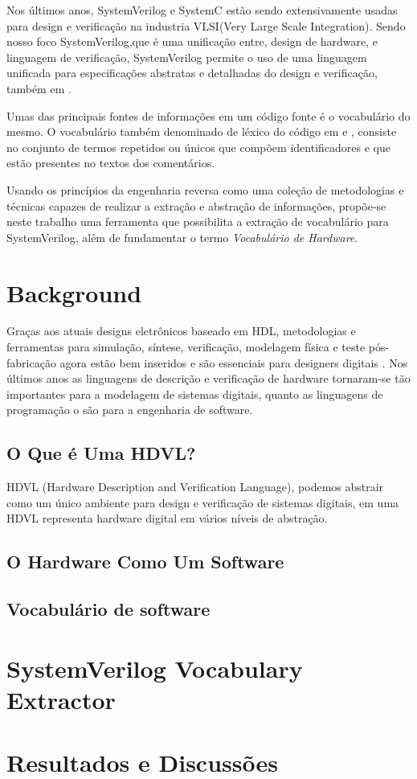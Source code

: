 \documentclass[12pt, twocolumn, a4paper]{article}
\begin{document}
Nos últimos anos, SystemVerilog e SystemC estão sendo extensivamente usadas para design e verificação na industria VLSI(Very Large Scale Integration)\cite{Kumar2014}. Sendo nosso foco SystemVerilog,que é uma unificação entre, design de hardware, e linguagem de verificação\cite{IEEEComputerSociety2013}, SystemVerilog permite o uso de uma linguagem unificada para especificações abstratas e detalhadas do design e verificação, também em \cite{IEEEComputerSociety2013}.

Umas das principais fontes de informações em um código fonte é o vocabulário do mesmo. O vocabulário também denominado de léxico do código em \cite{Host2007} e \cite{Antoniol2007}, consiste no conjunto de termos repetidos ou únicos que compõem identificadores e que estão presentes no textos dos comentários\cite{Abebe2009}.

Usando os princípios da engenharia reversa como uma coleção de metodologias e técnicas capazes de realizar a extração e abstração de informações\cite{BENEDUSI1992225}, propõe-se neste trabalho uma ferramenta que possibilita a extração de vocabulário para SystemVerilog, além de fundamentar o termo \textit{Vocabulário de Hardware}.

	\section{Background}
\quad Graças aos atuais designs eletrônicos baseado em HDL, metodologias e ferramentas para simulação, síntese, verificação, modelagem física e teste pós-fabricação agora estão bem inseridos e são essenciais para designers digitais \cite{Navabi2015}. Nos últimos anos as linguagens de descrição e verificação de hardware tornaram-se tão importantes para a modelagem de sistemas digitais, quanto as linguagens de programação o são para a engenharia de software. 
	\subsection{O Que é Uma HDVL?}
\quad HDVL (Hardware Description and Verification Language), podemos abstrair como um único ambiente para design e verificação de sistemas digitais, em \cite{Flake} uma HDVL representa hardware digital em vários níveis de abstração.
	\subsection{O Hardware Como Um Software}
\quad 
	\subsection{Vocabulário de software}
\quad
	\section{SystemVerilog Vocabulary Extractor}
	\section{Resultados e Discussões}
	
	
	
\end{document}
